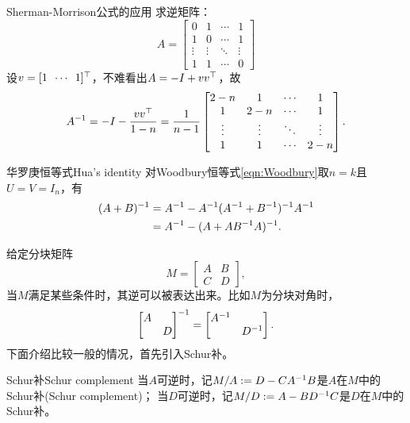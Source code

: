 \begin{example}
	{Sherman-Morrison公式的应用}{}
	求逆矩阵：
	\[
		A=\begin{bmatrix}
			0&1&\cdots&1\\
			1&0&\cdots&1\\
			\vdots&\vdots&\ddots&\vdots\\
			1&1&\cdots&0
		\end{bmatrix}
	\]
	设$v=[1\enspace\cdots\enspace 1]^\top$，不难看出$A=-I+vv^\top$，故
	\[
		A^{-1}=-I-\frac{vv^\top}{1-n}=\frac1{n-1}\begin{bmatrix}
			2-n&1&\cdots&1\\
			1&2-n&\cdots&1\\
			\vdots&\vdots&\ddots&\vdots\\
			1&1&\cdots&2-n
		\end{bmatrix}.
	\]
\end{example}

\begin{theorem}
	{华罗庚恒等式}{Hua's identity}
	对Woodbury恒等式\eqref{eqn:Woodbury}取$n=k$且$U=V=I_n$，有 
		\begin{subequations}
			\begin{align}
				(A+B)^{-1}&=A^{-1}-A^{-1}(A^{-1}+B^{-1})^{-1} A^{-1}\\
				\label{eqn:Hua}
				&=A^{-1}-(A+AB^{-1} A)^{-1}.
			\end{align}
		\end{subequations}
\end{theorem}


给定分块矩阵
\[
	M=\begin{bmatrix}
		A&B\\C&D
	\end{bmatrix},
\]
当$M$满足某些条件时，其逆可以被表达出来。比如$M$为分块对角时，
\begin{equation}
	\begin{bmatrix}
		A\\ &D
	\end{bmatrix}^{-1}=\begin{bmatrix}
		A^{-1}\\ &D^{-1}
	\end{bmatrix}.
\end{equation}
下面介绍比较一般的情况，首先引入Schur补。

\begin{definition}
	{Schur补}{Schur complement}
	当$A$可逆时，记$M/A:=D-CA^{-1} B$是$A$在$M$中的Schur补(Schur complement)；
	当$D$可逆时，记$M/D:=A-BD^{-1} C$是$D$在$M$中的Schur补。
\end{definition}

